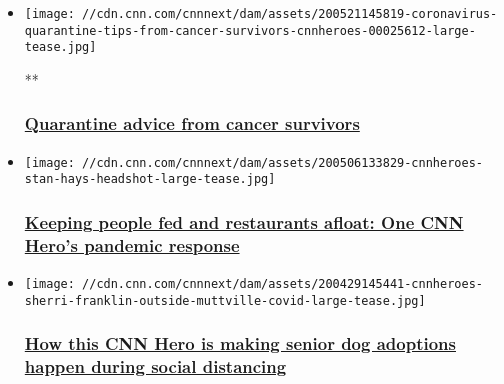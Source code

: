 \begin{itemize}
\item
  \href{/videos/tv/2020/05/21/coronavirus-quarantine-tips-from-cancer-survivors-cnnheroes.cnn}{}

  \texttt{[image: //cdn.cnn.com/cnnnext/dam/assets/200521145819-coronavirus-quarantine-tips-from-cancer-survivors-cnnheroes-00025612-large-tease.jpg]}

  **

  \hypertarget{quarantine-advice-from-cancer-survivors}{%
  \subsubsection{\texorpdfstring{\href{/videos/tv/2020/05/21/coronavirus-quarantine-tips-from-cancer-survivors-cnnheroes.cnn}{Quarantine
  advice from cancer
  survivors}}{Quarantine advice from cancer survivors}}\label{quarantine-advice-from-cancer-survivors}}
\end{itemize}

\begin{itemize}
\item
  \href{/2020/05/07/us/coronavirus-free-meals-struggling-restaurants-cnnheroes/index.html}{}

  \texttt{[image: //cdn.cnn.com/cnnnext/dam/assets/200506133829-cnnheroes-stan-hays-headshot-large-tease.jpg]}

  \hypertarget{keeping-people-fed-and-restaurants-afloat-one-cnn-heros-pandemic-response}{%
  \subsubsection{\texorpdfstring{\href{/2020/05/07/us/coronavirus-free-meals-struggling-restaurants-cnnheroes/index.html}{Keeping
  people fed and restaurants afloat: One CNN Hero's pandemic
  response}}{Keeping people fed and restaurants afloat: One CNN Hero's pandemic response}}\label{keeping-people-fed-and-restaurants-afloat-one-cnn-heros-pandemic-response}}
\end{itemize}

\begin{itemize}
\item
  \href{/2020/04/29/us/coronavirus-animal-shelters-muttville-senior-dog-adoptions-cnnheroes/index.html}{}

  \texttt{[image: //cdn.cnn.com/cnnnext/dam/assets/200429145441-cnnheroes-sherri-franklin-outside-muttville-covid-large-tease.jpg]}

  \hypertarget{how-this-cnn-hero-is-making-senior-dog-adoptions-happen-during-social-distancing}{%
  \subsubsection{\texorpdfstring{\href{/2020/04/29/us/coronavirus-animal-shelters-muttville-senior-dog-adoptions-cnnheroes/index.html}{How
  this CNN Hero is making senior dog adoptions happen during social
  distancing}}{How this CNN Hero is making senior dog adoptions happen during social distancing}}\label{how-this-cnn-hero-is-making-senior-dog-adoptions-happen-during-social-distancing}}
\end{itemize}

